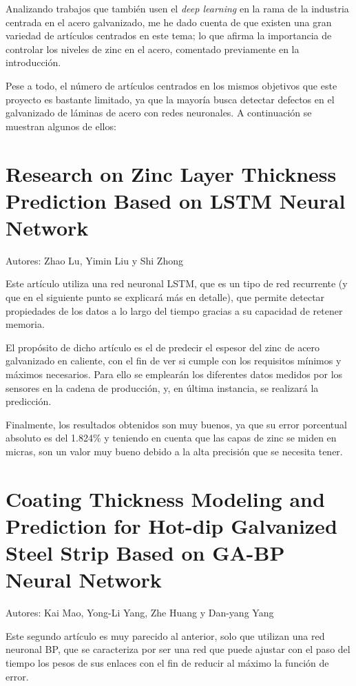 
Analizando trabajos que también usen el \emph{deep learning} en la rama de la industria centrada en el acero galvanizado, me he dado cuenta de que existen una gran variedad de artículos centrados en este tema; lo que afirma la importancia de controlar los niveles de zinc en el acero, comentado previamente en la introducción. 

Pese a todo, el número de artículos centrados en los mismos objetivos que este proyecto es bastante limitado, ya que la mayoría busca detectar defectos en el galvanizado de láminas de acero con redes neuronales. A continuación se muestran algunos de ellos:

\section{Research on Zinc Layer Thickness Prediction Based on LSTM Neural Network}
Autores: Zhao Lu, Yimin Liu y Shi Zhong

Este artículo \cite{9602402} utiliza una red neuronal LSTM, que es un tipo de red recurrente (y que en el siguiente punto se explicará más en detalle), que permite detectar propiedades de los datos a lo largo del tiempo gracias a su capacidad de retener memoria.

El propósito de dicho artículo es el de predecir el espesor del zinc de acero galvanizado en caliente, con el fin de ver si cumple con los requisitos mínimos y máximos necesarios. Para ello se emplearán los diferentes datos medidos por los sensores en la cadena de producción, y, en última instancia, se realizará la predicción.

Finalmente, los resultados obtenidos son muy buenos, ya que su error porcentual absoluto es del 1.824\% y teniendo en cuenta que las capas de zinc se miden en micras, son un valor muy bueno debido a la alta precisión que se necesita tener.

\section{Coating Thickness Modeling and Prediction for Hot-dip Galvanized Steel Strip Based on GA-BP Neural Network}
Autores: Kai Mao, Yong-Li Yang, Zhe Huang y Dan-yang Yang

Este segundo artículo \cite{9164854} es muy parecido al anterior, solo que utilizan una red neuronal BP, que se caracteriza por ser una red que puede ajustar con el paso del tiempo los pesos de sus enlaces con el fin de reducir al máximo la función de error.


